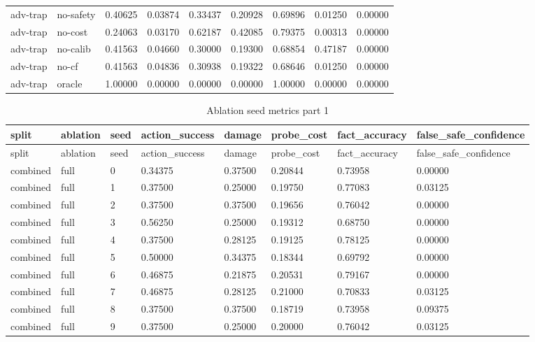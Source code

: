 \documentclass{article}
\begin{document}
\begin{center}
\begin{longtable}{lllllllll}
adv-trap & no-safety & 0.40625 & 0.03874 & 0.33437 & 0.20928 & 0.69896 & 0.01250 & 0.00000 \\
adv-trap & no-cost & 0.24063 & 0.03170 & 0.62187 & 0.42085 & 0.79375 & 0.00313 & 0.00000 \\
adv-trap & no-calib & 0.41563 & 0.04660 & 0.30000 & 0.19300 & 0.68854 & 0.47187 & 0.00000 \\
adv-trap & no-cf & 0.41563 & 0.04836 & 0.30938 & 0.19322 & 0.68646 & 0.01250 & 0.00000 \\
adv-trap & oracle & 1.00000 & 0.00000 & 0.00000 & 0.00000 & 1.00000 & 0.00000 & 0.00000 \\
\bottomrule
\end{longtable}
\renewcommand{\arraystretch}{1.0}
\end{center}


\begin{center}
\tiny
\renewcommand{\arraystretch}{0.92}
\setlength{\tabcolsep}{3pt}
\begin{longtable}{llllllll}
\caption{Ablation seed metrics part 1}\label{tab:ablation-seed-metrics-1}\\
\toprule
split & ablation & seed & action\_success & damage & probe\_cost & fact\_accuracy & false\_safe\_confidence \\
\midrule
\endfirsthead
\toprule
split & ablation & seed & action\_success & damage & probe\_cost & fact\_accuracy & false\_safe\_confidence \\
\midrule
\endhead
combined & full & 0 & 0.34375 & 0.37500 & 0.20844 & 0.73958 & 0.00000 \\
combined & full & 1 & 0.37500 & 0.25000 & 0.19750 & 0.77083 & 0.03125 \\
combined & full & 2 & 0.37500 & 0.37500 & 0.19656 & 0.76042 & 0.00000 \\
combined & full & 3 & 0.56250 & 0.25000 & 0.19312 & 0.68750 & 0.00000 \\
combined & full & 4 & 0.37500 & 0.28125 & 0.19125 & 0.78125 & 0.00000 \\
combined & full & 5 & 0.50000 & 0.34375 & 0.18344 & 0.69792 & 0.00000 \\
combined & full & 6 & 0.46875 & 0.21875 & 0.20531 & 0.79167 & 0.00000 \\
combined & full & 7 & 0.46875 & 0.28125 & 0.21000 & 0.70833 & 0.03125 \\
combined & full & 8 & 0.37500 & 0.37500 & 0.18719 & 0.73958 & 0.09375 \\
combined & full & 9 & 0.37500 & 0.25000 & 0.20000 & 0.76042 & 0.03125 \\

\end{longtable}
\end{center}
\end{document}
